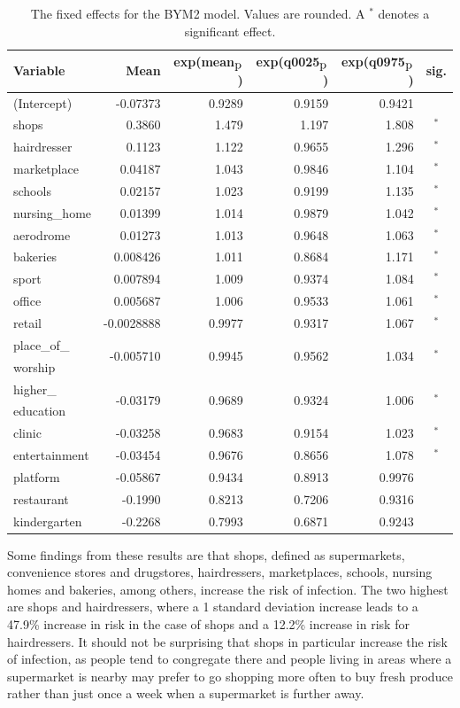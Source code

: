 \begin{table}[H] 
\caption{The fixed effects for the BYM2 model. Values are rounded. A $^*$ denotes a significant effect.\label{fixedInfraGermany}}
\begin{tabular}{l r r r r c}
\toprule
\textbf{Variable}	& \textbf{Mean}	& \textbf{exp(mean$_{\hbox{p}}$)} & \textbf{exp(q0025$_{\hbox{p}}$)} & \textbf{exp(q0975$_{\hbox{p}}$)} & \textbf{sig.}\\
\midrule
(Intercept) & -0.07373 & 0.9289 & 0.9159 & 0.9421 &\\
shops & 0.3860 & 1.479 & 1.197 & 1.808 &$^*$\\
hairdresser & 0.1123 & 1.122 & 0.9655 & 1.296 &$^*$\\
marketplace & 0.04187 & 1.043 & 0.9846 & 1.104 &$^*$\\
schools & 0.02157 & 1.023 & 0.9199 & 1.135 &$^*$\\
nursing\_home & 0.01399 & 1.014 & 0.9879 & 1.042 &$^*$\\
aerodrome & 0.01273 & 1.013 & 0.9648 & 1.063 &$^*$\\
bakeries & 0.008426 & 1.011 & 0.8684 & 1.171 &$^*$\\
sport & 0.007894 & 1.009 & 0.9374 & 1.084& $^*$\\
office & 0.005687 & 1.006 & 0.9533 & 1.061 &$^*$\\
retail & -0.0028888 & 0.9977 & 0.9317 & 1.067 &$^*$\\
place\_of\_ & \multirow{2}{*}{-0.005710} & \multirow{2}{*}{0.9945} & \multirow{2}{*}{0.9562} & \multirow{2}{*}{1.034} &\multirow{2}{*}{$^*$}\\
worship &  \\
higher\_ & \multirow{2}{*}{-0.03179} & \multirow{2}{*}{0.9689} & \multirow{2}{*}{0.9324} & \multirow{2}{*}{1.006} &\multirow{2}{*}{$^*$}\\
education \\
clinic & -0.03258 & 0.9683 & 0.9154 & 1.023 &$^*$\\
entertainment & -0.03454 & 0.9676 & 0.8656 & 1.078 &$^*$\\
platform & -0.05867 & 0.9434 & 0.8913 & 0.9976 &\\
restaurant & -0.1990 & 0.8213 & 0.7206 & 0.9316 &\\
kindergarten & -0.2268 & 0.7993 & 0.6871 & 0.9243 &\\
\bottomrule
\end{tabular}
\end{table}
Some findings from these results are that shops, defined as supermarkets, convenience stores and drugstores, hairdressers, marketplaces, schools, nursing homes and bakeries, among others, increase the risk of infection. The two highest are shops and hairdressers, where a 1 standard deviation increase leads to a 47.9\% increase in risk in the case of shops and a 12.2\% increase in risk for hairdressers. It should not be surprising that shops in particular increase the risk of infection, as people tend to congregate there and people living in areas where a supermarket is nearby may prefer to go shopping more often to buy fresh produce rather than just once a week when a supermarket is further away. \\
